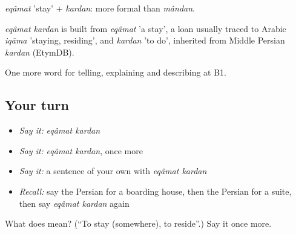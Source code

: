 \emph{eqâmat} 'stay' + \emph{kardan}: more formal than \emph{mândan}.

\begin{cousinweb}
\emph{eqâmat kardan} is built from \emph{eqâmat} 'a stay', a loan usually traced to Arabic \emph{iqāma} 'staying, residing', and \emph{kardan} 'to do', inherited from Middle Persian \emph{kardan} (EtymDB).
\end{cousinweb}

\begin{grammarlens}[title={What you've built}]
One more word for telling, explaining and describing at B1.
\end{grammarlens}

\subsection*{Your turn}
\begin{itemize}
\raggedright
  \item \emph{Say it:} \emph{eqâmat kardan}
  \item \emph{Say it:} \emph{eqâmat kardan}, once more
  \item \emph{Say it:} a sentence of your own with \emph{eqâmat kardan}
  \item \emph{Recall:} say the Persian for a boarding house, then the Persian for a suite, then say \emph{eqâmat kardan} again
\end{itemize}

\begin{tcolorbox}[breakable,colback=teal!4,colframe=teal!35!black,title={Before you move on}]
What does   mean? (\textquotedblleft{}To stay (somewhere), to reside\textquotedblright{}.) Say it once more.
\end{tcolorbox}
